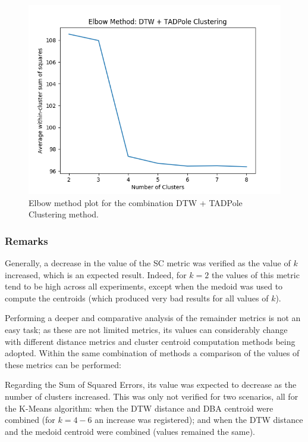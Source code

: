 \documentclass[9pt,journal,compsoc]{IEEEtran}
\begin{document}
\begin{figure}[ht]
	\centering
	\includegraphics[scale=0.5]{images/raw_dtw_TADPole.png}
	\caption{Elbow method plot for the combination DTW + TADPole Clustering method.}
	\label{elbow_method_tad}
\end{figure}

\subsubsection{Remarks}

Generally, a decrease in the value of the SC metric was verified as the value of $k$ increased, which is an expected result. Indeed, for $k = 2$ the values of this metric tend to be high across all experiments, except when the medoid was used to compute the centroids (which produced very bad results for all values of $k$).

Performing a deeper and comparative analysis of the remainder metrics is not an easy task; as these are not limited metrics, its values can considerably change with different distance metrics and cluster centroid computation methods being adopted. Within the same combination of methods a comparison of the values of these metrics can be performed:

Regarding the Sum of Squared Errors, its value was expected to decrease as the number of clusters increased. This was only not verified for two scenarios, all for the K-Means algorithm: when the DTW distance and DBA centroid were combined (for $k = 4 - 6$ an increase was registered); and when the DTW distance and the medoid centroid were combined (values remained the same).
\end{document}
